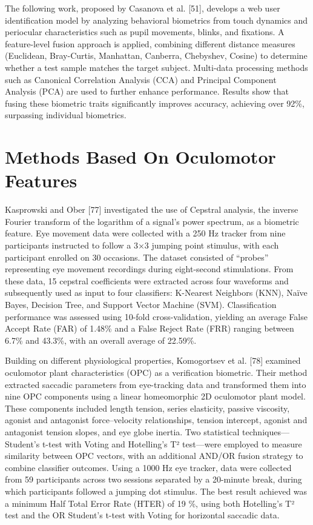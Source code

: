 \documentclass[12pt]{report}
\begin{document}
The following work, proposed by Casanova et al. [51], develops a web user identification model by analyzing behavioral biometrics from touch dynamics and periocular characteristics such as pupil movements, blinks, and fixations.
A feature-level fusion approach is applied, combining different distance measures (Euclidean, Bray-Curtis, Manhattan, Canberra, Chebyshev, Cosine) to determine whether a test sample matches the target subject.
Multi-data processing methods such as Canonical Correlation Analysis (CCA) and Principal Component Analysis (PCA) are used to further enhance performance.
Results show that fusing these biometric traits significantly improves accuracy, achieving over 92\%, surpassing individual biometrics.

\section{Methods Based On Oculomotor Features}

Kasprowski and Ober [77] investigated the use of Cepstral analysis, the inverse Fourier transform of the logarithm of a signal's power spectrum, as a biometric feature.
Eye movement data were collected with a 250 Hz tracker from nine participants instructed to follow a 3×3 jumping point stimulus, with each participant enrolled on 30 occasions. 
The dataset consisted of “probes” representing eye movement recordings during eight-second stimulations. 
From these data, 15 cepstral coefficients were extracted across four waveforms and subsequently used as input to four classifiers: K-Nearest Neighbors (KNN), Naïve Bayes, Decision Tree, and Support Vector Machine (SVM). 
Classification performance was assessed using 10-fold cross-validation, yielding an average False Accept Rate (FAR) of 1.48\% and a False Reject Rate (FRR) ranging between 6.7\% and 43.3\%, with an overall average of 22.59\%.

Building on different physiological properties, Komogortsev et al. [78] examined oculomotor plant characteristics (OPC) as a verification biometric. 
Their method extracted saccadic parameters from eye-tracking data and transformed them into nine OPC components using a linear homeomorphic 2D oculomotor plant model. 
These components included length tension, series elasticity, passive viscosity, agonist and antagonist force–velocity relationships, tension intercept, agonist and antagonist tension slopes, and eye globe inertia. 
Two statistical techniques—Student's t-test with Voting and Hotelling's T² test—were employed to measure similarity between OPC vectors, with an additional AND/OR fusion strategy to combine classifier outcomes. 
Using a 1000 Hz eye tracker, data were collected from 59 participants across two sessions separated by a 20-minute break, during which participants followed a jumping dot stimulus. 
The best result achieved was a minimum Half Total Error Rate (HTER) of 19 \%, using both Hotelling's T² test and the OR Student's t-test with Voting for horizontal saccadic data.
\end{document}
